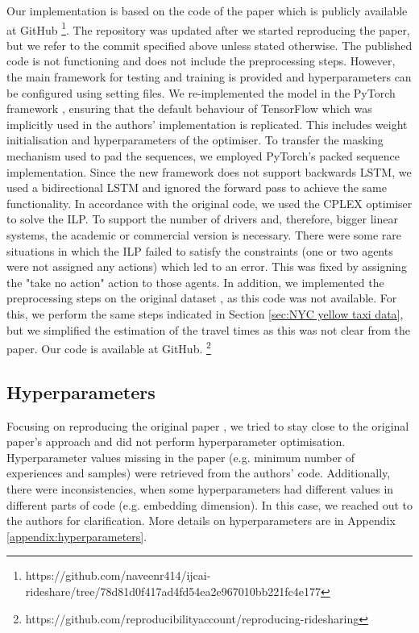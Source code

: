 Our implementation is based on the code of the paper which is publicly available at GitHub \footnote{https://github.com/naveenr414/ijcai-rideshare/tree/78d81d0f417ad4fd54ea2e967010bb221fc4e177}. The repository was updated after we started reproducing the paper, but we refer to the commit specified above unless stated otherwise. The published code is not functioning and does not include the preprocessing steps. However, the main framework for testing and training is provided and hyperparameters can be configured using setting files. We re-implemented the model in the PyTorch framework \cite{pytorch}, ensuring that the default behaviour of TensorFlow which was implicitly used in the authors' implementation is replicated. This includes weight initialisation and hyperparameters of the optimiser. To transfer the masking mechanism used to pad the sequences, we employed PyTorch's packed sequence implementation. Since the new framework does not support backwards LSTM, we used a bidirectional LSTM and ignored the forward pass to achieve the same functionality. In accordance with the original code, we used the CPLEX optimiser \cite{ibm_cplex} to solve the ILP. To support the number of drivers and, therefore, bigger linear systems, the academic or commercial version is necessary. There were some rare situations in which the ILP failed to satisfy the constraints (one or two agents were not assigned any actions) which led to an error. This was fixed by assigning the "take no action" action to those agents. In addition, we implemented the preprocessing steps on the original dataset \citep{ny16}, as this code was not available. For this, we perform the same steps indicated in Section \ref{sec:NYC yellow taxi data}, but we simplified the estimation of the travel times as this was not clear from the paper. Our code is available at GitHub. \footnote{https://github.com/reproducibilityaccount/reproducing-ridesharing}

\subsection{Hyperparameters}\label{sec:Hyperparameters}

Focusing on reproducing the original paper \cite{raman21}, we tried to stay close to the original paper's approach and did not perform hyperparameter optimisation. Hyperparameter values missing in the paper (e.g. minimum number of experiences and samples) were retrieved from the authors' code. Additionally, there were inconsistencies, when some hyperparameters had different values in different parts of code (e.g. embedding dimension). In this case, we reached out to the authors for clarification. More details on hyperparameters are in Appendix \ref{appendix:hyperparameters}. 





